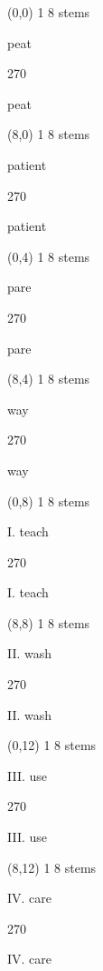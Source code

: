 \documentclass[a4paper]{article}
\newenvironment{itemize*}%
{\begin{itemize}%
 \setlength{\itemsep}{0.5cm}%
 \setlength{\parsep}{0pt}%
 \setlength{\parskip}{0pt}}%
{\end{itemize}}
\newcommand{\mycard}[3]{%
	\small #1 #2
	\par
	\parbox[t][6.8cm][c]{9.5cm}{%
	\par
	\myleft{#3}
	\par
	\myright{#3}
	}
}
\newcommand{\myleft}[1]{%
	\begin{sideways}
	\hspace*{-0.9cm}
		\parbox[t][2.7cm][t]{6.5cm}{%
		\Huge #1
		}
	\end{sideways}
}
\newcommand{\myright}[1]{%
	\hspace*{6.5cm}
	\begin{turn}{270}
	\hspace*{-7.1cm}
		\parbox[t][2.7cm][t]{6.5cm}{%
		\Huge #1
		}
	\end{turn}
}
\begin{document}
\begin{textblock}{8}(0,0)
\mycard{1}{8 stems}{
\begin{itemize*}
\item \hspace{1cm} peat
\end{itemize*}
}
\end{textblock}

\begin{textblock}{8}(8,0)
\mycard{1}{8 stems}{
\begin{itemize*}
\item \hspace{1cm} patient
\end{itemize*}
}
\end{textblock}

\begin{textblock}{8}(0,4)
\mycard{1}{8 stems}{
\begin{itemize*}
\item \hspace{1cm} pare
\end{itemize*}
}
\end{textblock}

\begin{textblock}{8}(8,4)
\mycard{1}{8 stems}{
\begin{itemize*}
\item \hspace{1cm} way
\end{itemize*}
}
\end{textblock}

\begin{textblock}{8}(0,8)
\mycard{1}{8 stems}{
\begin{itemize*}
\item \hspace{1cm} I. teach
\end{itemize*}
}
\end{textblock}

\begin{textblock}{8}(8,8)
\mycard{1}{8 stems}{
\begin{itemize*}
\item \hspace{1cm} II. wash
\end{itemize*}
}
\end{textblock}

\begin{textblock}{8}(0,12)
\mycard{1}{8 stems}{
\begin{itemize*}
\item \hspace{1cm} III. use
\end{itemize*}
}
\end{textblock}

\begin{textblock}{8}(8,12)
\mycard{1}{8 stems}{
\begin{itemize*}
\item \hspace{1cm} IV. care
\end{itemize*}
}
\end{textblock}

\null
\newpage
\end{document}
